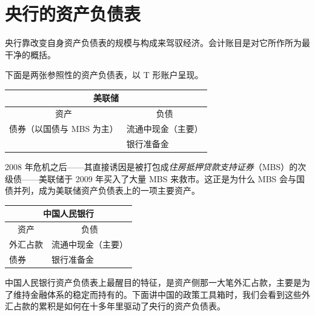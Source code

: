 \section{央行的资产负债表}

央行靠改变自身资产负债表的规模与构成来驾驭经济。会计账目是对它所作所为最干净的概括。


下面是两张参照性的资产负债表，以 T 形账户呈现。

\begin{table}[h]
\centering
\begin{tabular}{@{}p{} p{}@{}}
\multicolumn{2}{c}{\textbf{美联储}}\\
\toprule
\multicolumn{1}{c}{资产} & \multicolumn{1}{c}{负债}\\
\midrule
债券（以国债与 MBS 为主） & 流通中现金（主要） \\
 & 银行准备金 \\
\bottomrule
\end{tabular}
\end{table}

\begin{remark}
2008 年危机之后——其直接诱因是被打包成\emph{住房抵押贷款支持证券}（MBS）的次级债——美联储于 2009 年买入了大量 MBS 来救市。这正是为什么 MBS 会与国债并列，成为美联储资产负债表上的一项主要资产。
\end{remark}

\begin{table}[h]
\centering
\begin{tabular}{@{}p{} p{}@{}}
\multicolumn{2}{c}{\textbf{中国人民银行}}\\
\toprule
\multicolumn{1}{c}{资产} & \multicolumn{1}{c}{负债}\\
\midrule
外汇占款 & 流通中现金（主要） \\
债券 & 银行准备金 \\
\bottomrule
\end{tabular}
\end{table}

中国人民银行资产负债表上最醒目的特征，是资产侧那一大笔外汇占款，主要是为了维持金融体系的稳定而持有的。下面讲中国的政策工具箱时，我们会看到这些外汇占款的累积是如何在十多年里驱动了央行的资产负债表。

